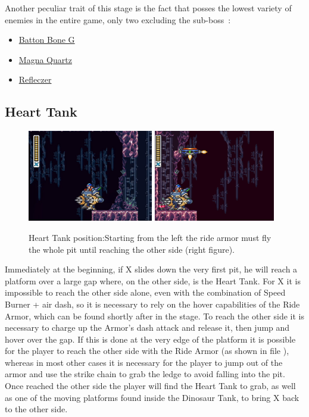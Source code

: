 Another peculiar trait of this stage is the fact that posses the lowest variety of enemies in the entire game, only two excluding the sub-boss~\cite{wiki:Energen_mine}:
\begin{itemize}
	\item \hyperlink {enem:Batton_Bone_type_G}{Batton Bone G}
	\item \hyperlink {miniboss:Magna_Quartz}{Magna Quartz}
	\item \hyperlink {enem:Refleczer}{Refleczer}
\end{itemize}

\subsection{Heart Tank}
\begin{figure}[htp]
	\centering
	\includegraphics[height=4cm]{figures/X2/Crystal_snail/Crystal_heart_starting_spot.png}
	\includegraphics[height=4cm]{figures/X2/Crystal_snail/Crystal_heart.png}
	\caption{Heart Tank position:Starting from the left the ride armor must fly the whole pit until reaching the other side (right figure).}
\end{figure}
Immediately at the beginning, if X slides down the very first pit, he will reach a platform over a large gap where, on the other side, is the Heart Tank. For X it is impossible to reach the other side alone, even with the combination of Speed Burner + air dash, so it is necessary to rely on the hover capabilities of the Ride Armor, which can be found shortly after in the stage. To reach the other side it is necessary to charge up the Armor's dash attack and release it, then jump and hover over the gap. If this is done at the very edge of the platform it is possible for the player to reach the other side with the Ride Armor (as shown in file ), whereas in most other cases it is necessary for the player to jump out of the armor and  use the strike chain to grab the ledge to avoid falling into the pit. Once reached the other side the player will find the Heart Tank to grab, as well as one of the moving platforms found inside the Dinosaur Tank, to bring X back to the other side.


